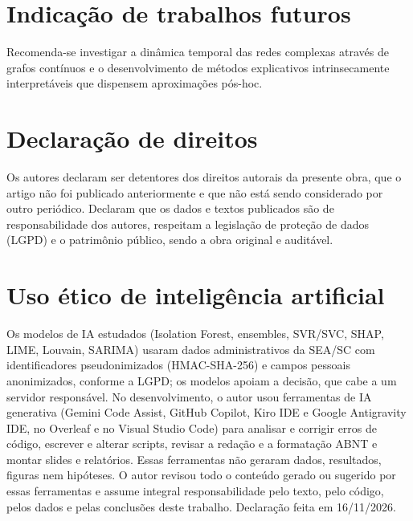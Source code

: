 \documentclass[12pt,a4paper]{article}
\begin{document}
\section{Indicação de trabalhos futuros}

Recomenda-se investigar a dinâmica temporal das redes complexas através de grafos contínuos e o desenvolvimento de métodos explicativos intrinsecamente interpretáveis que dispensem aproximações pós-hoc.


\section{Declaração de direitos}

Os autores declaram ser detentores dos direitos autorais da presente obra, que o artigo não foi publicado anteriormente e que não está sendo considerado por outro periódico. Declaram que os dados e textos publicados são de responsabilidade dos autores, respeitam a legislação de proteção de dados (LGPD) e o patrimônio público, sendo a obra original e auditável.


\section*{Uso ético de inteligência artificial}
Os modelos de IA estudados (Isolation Forest, ensembles, SVR/SVC, SHAP, LIME, Louvain, SARIMA) usaram dados administrativos da SEA/SC com identificadores pseudonimizados (HMAC-SHA-256) e campos pessoais anonimizados, conforme a LGPD; os modelos apoiam a decisão, que cabe a um servidor responsável. No desenvolvimento, o autor usou ferramentas de IA generativa (Gemini Code Assist, GitHub Copilot, Kiro IDE e Google Antigravity IDE, no Overleaf e no Visual Studio Code) para analisar e corrigir erros de código, escrever e alterar scripts, revisar a redação e a formatação ABNT e montar slides e relatórios. Essas ferramentas não geraram dados, resultados, figuras nem hipóteses. O autor revisou todo o conteúdo gerado ou sugerido por essas ferramentas e assume integral responsabilidade pelo texto, pelo código, pelos dados e pelas conclusões deste trabalho. Declaração feita em 16/11/2026.
\end{document}
